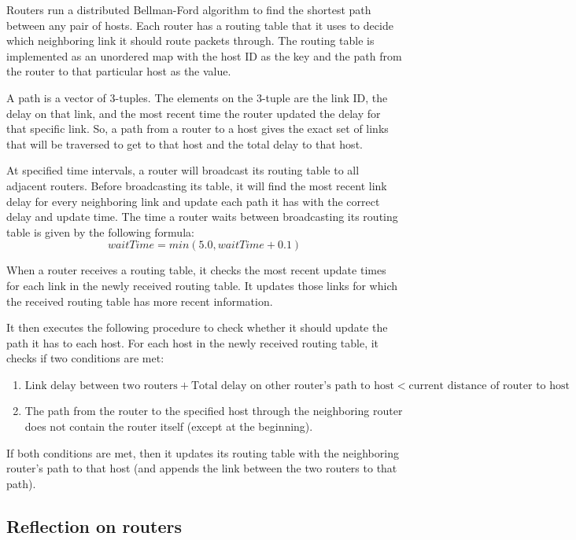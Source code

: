 \documentclass[12pt]{article}
\begin{document}
Routers run a distributed Bellman-Ford algorithm to find the shortest path between any pair of hosts. Each router has a routing table that it uses to decide which neighboring link it should route packets through. The routing table is implemented as an unordered map with the host ID as the key and the path from the router to that particular host as the value.
 
A path is a vector of 3-tuples. The elements on the 3-tuple are the link ID, the delay on that link, and the most recent time the router updated the delay for that specific link. So, a path from a router to a host gives the exact set of links that will be traversed to get to that host and the total delay to that host.
 
At specified time intervals, a router will broadcast its routing table to all adjacent routers. Before broadcasting its table, it will find the most recent link delay for every neighboring link and update each path it has with the correct delay and update time. The time a router waits between broadcasting its routing table is given by the following formula: 
$$waitTime = min(5.0, waitTime + 0.1)$$

When a router receives a routing table, it checks the most recent update times for each link in the newly received routing table.  It updates those links for which the received routing table has more recent information.

It then executes the following procedure to check whether it should update the path it has to each host. For each host in the newly received routing table, it checks if two conditions are met:
\begin{enumerate} \item $\text{Link delay between two routers} + \text{Total delay on other router’s path to host} < \text{current distance of router to host} $
\item The path from the router to the specified host through the neighboring router does not contain the router itself (except at the beginning).
\end{enumerate}
If both conditions are met, then it updates its routing table with the neighboring router’s path to that host (and appends the link between the two routers to that path).


\subsection*{Reflection on routers}
 
\end{document}
